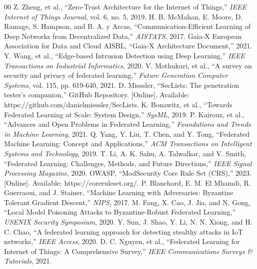 \documentclass[conference]{IEEEtran}
\begin{document}
\begin{thebibliography}{00}
 Z. Zheng, et al., ``Zero-Trust Architecture for the Internet of Things,'' \textit{IEEE Internet of Things Journal}, vol. 6, no. 5, 2019.
 H. B. McMahan, E. Moore, D. Ramage, S. Hampson, and B. A. y Arcas, ``Communication-Efficient Learning of Deep Networks from Decentralized Data,'' \textit{AISTATS}, 2017.
 Gaia-X European Association for Data and Cloud AISBL, ``Gaia-X Architecture Document,'' 2021.
 Y. Wang, et al., ``Edge-based Intrusion Detection using Deep Learning,'' \textit{IEEE Transactions on Industrial Informatics}, 2020.
 V. Mothukuri, et al., ``A survey on security and privacy of federated learning,'' \textit{Future Generation Computer Systems}, vol. 115, pp. 619-640, 2021.
 D. Miessler, ``SecLists: The penetration tester's companion,'' GitHub Repository. [Online]. Available: https://github.com/danielmiessler/SecLists.
 K. Bonawitz, et al., ``Towards Federated Learning at Scale: System Design,'' \textit{SysML}, 2019.
 P. Kairouz, et al., ``Advances and Open Problems in Federated Learning,'' \textit{Foundations and Trends in Machine Learning}, 2021.
 Q. Yang, Y. Liu, T. Chen, and Y. Tong, ``Federated Machine Learning: Concept and Applications,'' \textit{ACM Transactions on Intelligent Systems and Technology}, 2019.
 T. Li, A. K. Sahu, A. Talwalkar, and V. Smith, ``Federated Learning: Challenges, Methods, and Future Directions,'' \textit{IEEE Signal Processing Magazine}, 2020.
 OWASP, ``ModSecurity Core Rule Set (CRS),'' 2023. [Online]. Available: https://coreruleset.org/.
 P. Blanchard, E. M. El Mhamdi, R. Guerraoui, and J. Stainer, ``Machine Learning with Adversaries: Byzantine Tolerant Gradient Descent,'' \textit{NIPS}, 2017.
 M. Fang, X. Cao, J. Jia, and N. Gong, ``Local Model Poisoning Attacks to Byzantine-Robust Federated Learning,'' \textit{USENIX Security Symposium}, 2020.
 Y. Sun, J. Shao, Y. Li, N. N. Xiong, and H. C. Chao, ``A federated learning approach for detecting stealthy attacks in IoT networks,'' \textit{IEEE Access}, 2020.
 D. C. Nguyen, et al., ``Federated Learning for Internet of Things: A Comprehensive Survey,'' \textit{IEEE Communications Surveys \& Tutorials}, 2021.
\end{thebibliography}
\end{document}
